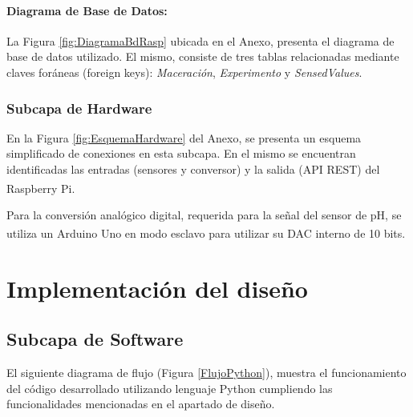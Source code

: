                 \paragraph{Diagrama de Base de Datos:} La Figura \ref{fig:DiagramaBdRasp} ubicada en el Anexo, presenta el diagrama de base de datos utilizado. El mismo, consiste de tres tablas relacionadas mediante claves foráneas (foreign keys): \textit{Maceración}, \textit{Experimento} y \textit{SensedValues}. 
                
                
            \subsubsection{Subcapa de Hardware} 
                \par En la Figura \ref{fig:EsquemaHardware} del Anexo, se presenta un esquema simplificado de conexiones en esta subcapa. En el mismo se encuentran identificadas las entradas (sensores y conversor) y la salida (API REST) del Raspberry\textsuperscript{\textregistered} Pi.
                
                
                
                \par Para la conversión analógico digital, requerida para la señal del sensor de pH, se utiliza un Arduino\textsuperscript{\textregistered} Uno en modo esclavo para utilizar su DAC interno de 10 bits.
        
    
\section{Implementación del diseño}

    \subsection{Subcapa de Software}
        \par El siguiente diagrama de flujo (Figura \ref{FlujoPython}), muestra el funcionamiento del código desarrollado utilizando lenguaje Python cumpliendo las funcionalidades mencionadas en el apartado de diseño.

